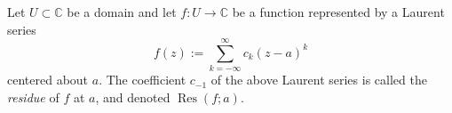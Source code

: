 \documentclass[12pt]{article}
\begin{document}
Let $U \subset \mathbb{C}$ be a domain and let $f: U \longrightarrow \mathbb{C}$ be a function represented by a Laurent series
$$
f(z) := \sum_{k=-\infty}^\infty c_k (z-a)^k
$$
centered about $a$. The coefficient $c_{-1}$ of the above Laurent series is called the \emph{residue} of $f$ at $a$, and denoted $\operatorname{Res}(f;a)$.
\end{document}
